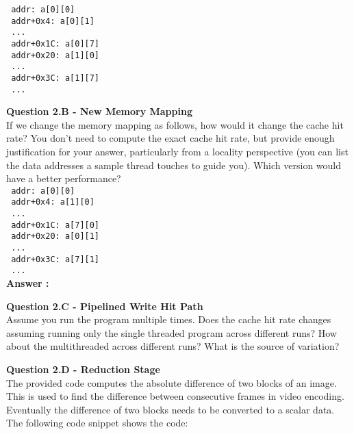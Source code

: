 \documentclass[a4paper,11pt]{article}
\newcommand{\answer}{\textbf{Answer : }}
\begin{document}
\verb, addr: a[0][0] ,\\
\verb, addr+0x4: a[0][1] ,\\
\verb, ... ,\\
\verb, addr+0x1C: a[0][7] ,\\
\verb, addr+0x20: a[1][0] ,\\
\verb, ... ,\\
\verb, addr+0x3C: a[1][7] ,\\
\verb, ... ,\\


\item \textbf{Question 2.B - New Memory Mapping} \\ 

If we change the memory mapping as follows, how would it change the cache hit rate? You don’t need to compute the exact cache hit rate, but provide enough justification for your answer, particularly from a locality perspective (you can list the data addresses a sample thread touches to guide you). Which version would have a better performance? \\

\verb, addr: a[0][0] , \\
\verb, addr+0x4: a[1][0] , \\
\verb, ... , \\
\verb, addr+0x1C: a[7][0] , \\
\verb, addr+0x20: a[0][1] , \\
\verb, ... , \\
\verb, addr+0x3C: a[7][1] , \\
\verb, ... , \\

\answer 

  
\item \textbf{Question 2.C - Pipelined Write Hit Path} \\

Assume you run the program multiple times. Does the cache hit rate changes assuming running only the single threaded program across different runs? How about the multithreaded across different runs? What is the source of variation?


\item \textbf{Question 2.D - Reduction Stage} \\

The provided code computes the absolute difference of two blocks of an image. This is used to find the difference between consecutive frames in video encoding. Eventually the difference of two blocks needs to be converted to a scalar data. The following code snippet shows the code:
\end{document}
